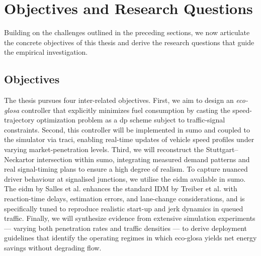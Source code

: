 \section{Objectives and Research Questions}
\label{sec:Objectives_and_Research_Questions}

Building on the challenges outlined in the preceding sections, we now articulate the concrete objectives of this thesis and derive the research questions that guide the empirical investigation.

\subsection{Objectives}
\label{subsec:Objectives}
The thesis pursues four inter-related objectives. 
First, we aim to design an \emph{\ac{eco-glosa}} controller that explicitly minimizes fuel consumption by casting the speed-trajectory optimization problem as a \ac{dp} scheme subject to traffic-signal constraints. 
Second, this controller will be implemented in \ac{sumo} and coupled to the simulator via \ac{traci}, enabling real-time updates of vehicle speed profiles under varying market-penetration levels. 
Third, we will reconstruct the Stuttgart–Neckartor intersection within \ac{sumo}, integrating measured demand patterns and real signal-timing plans to ensure a high degree of realism. To capture nuanced driver behaviour at signalised junctions, we utilise the \ac{eidm} available in \ac{sumo}. The \ac{eidm} by Salles et al. enhances the standard IDM by Treiber et al. \cite{Treiber_2000} with reaction-time delays, estimation errors, and lane-change considerations, and is specifically tuned to reproduce realistic start-up and jerk dynamics in queued traffic. \cite{Salles2022}
Finally, we will synthesize evidence from extensive simulation experiments --- varying both penetration rates and traffic densities --- to derive deployment guidelines that identify the operating regimes in which \ac{eco-glosa} yields net energy savings without degrading flow.

